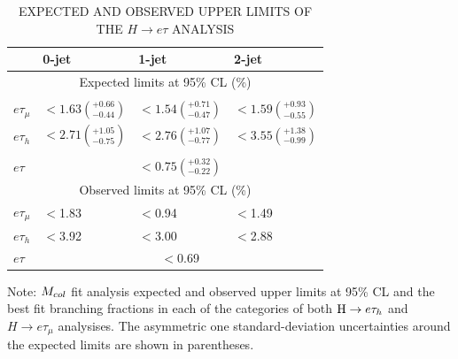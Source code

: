 \begin{table}[hbtp]
 \centering
  \caption{EXPECTED AND OBSERVED UPPER LIMITS OF THE $H\to e\tau$ ANALYSIS}
 \begin{threeparttable}
  \label{tab:expected_limits}
  {
  \begin{tabular}{l|l|l|l} \hline
                     &  0-jet  & 1-jet  &  2-jet  \\ \hline
\multicolumn{4}{c}{Expected limits at 95\% CL  (\%)}\\  \hline \\[-2.2ex]
        $e\tau_{\mu}$  &  ${<}1.63\left({}_{-0.44}^{+0.66}\right)$ &  ${<}1.54\left({}_{-0.47}^{+0.71}\right)$ &  ${<}1.59\left({}_{-0.55}^{+0.93}\right)$  \\[0.4ex]
        $e\tau_{h}$  &  ${<}2.71\left({}_{-0.75}^{+1.05}\right)$ & ${<}2.76\left({}_{-0.77}^{+1.07}\right)$ &  ${<}3.55\left({}_{-0.99}^{+1.38}\right)$ \\[0.4ex] \hline\\[-2.2ex]
            $e\tau$  & \multicolumn{3}{c}{  ${<}0.75\left({}_{-0.22}^{+0.32}\right)$  } \\[0.4ex] \hline
\multicolumn{4}{c}{Observed limits at 95\% CL (\%)} \\ \hline
       $e\tau_{\mu}$  &  $<$1.83  &  $<$0.94 &  $<$1.49   \\
      $e\tau_{h}$  & $<$3.92 & $<$3.00 & $<$2.88 \\ \hline
             $e\tau$  & \multicolumn{3}{c}{  $<$0.69 }   \\ \hline
  \end{tabular}
}
\begin{tablenotes}
\small
\item Note: $M_{col}$ fit analysis expected and observed upper limits at 95\% CL and the best fit branching fractions in each of the categories of both $\mathrm{H} \to e \tau_{h}$ and $H \to e \tau_{\mu}$ analysises. The asymmetric one standard-deviation uncertainties around the expected limits are shown in parentheses.
\end{tablenotes}
\end{threeparttable}
\end{table}




